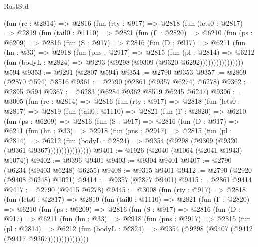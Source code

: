 \begin{lexlean}{RustStd}
\begin{coremodule}
{\begin{coremodule}
{{{{{{{{{{{{{{{{{{{{{{{{{{      (fun (rc : @2814) =>
      @2816
        (fun (rty : @917) =>
        @2818
          (fun (lets0 : @2817) =>
          @2819
            (fun (tail0 : @1110) =>
            @2821
              (fun (Γ : @2820) =>
              @6210
                (fun (ps : @6209) =>
                @2816
                  (fun (S : @917) =>
                  @2816
                    (fun (D : @917) =>
                    @6211
                      (fun (hn : @33) =>
                      @2918
                        (fun (pns : @2917) =>
                        @2815
                          (fun (pl : @2814) =>
                          @6212
                            (fun (bodyL : @2824) => @9293 (@9298 (@9309 (@9320 @6292))))))))))))))))
    @594
@9353 := @9291 (@2807 @594)
@9354 := @2790 @9353
@9357 := @2869 (@2870 @594) @8516
@9361 := @2790 (@2861 (@9357 @6274) @6278)
@9362 := @2895 @594
@9367 := @6283 (@6284 @9362 @8519 @6245 @6247)
@9396 := @3005
    (fun (rc : @2814) =>
    @2816
      (fun (rty : @917) =>
      @2818
        (fun (lets0 : @2817) =>
        @2819
          (fun (tail0 : @1110) =>
          @2821
            (fun (Γ : @2820) =>
            @6210
              (fun (ps : @6209) =>
              @2816
                (fun (S : @917) =>
                @2816
                  (fun (D : @917) =>
                  @6211
                    (fun (hn : @33) =>
                    @2918
                      (fun (pns : @2917) =>
                      @2815
                        (fun (pl : @2814) =>
                        @6212
                          (fun (bodyL : @2824) =>
                          @9354 (@9298 (@9309 (@9320 (@9361 @9367))))))))))))))))
@9401 := @1926 (@2040 (@1064 (@2041 @1943) @1074))
@9402 := @9396 @9401
@9403 := @9304 @9401
@9407 := @2790 (@6234 (@9403 @6248) @6255)
@9408 := @9315 @9401
@9412 := @2790 (@2920 (@9408 @6248) @1021)
@9414 := @9357 (@2877 @9401)
@9415 := @2861 @9414
@9417 := @2790 (@9415 @6278)
@9445 := @3008
    (fun (rty : @917) =>
    @2818
      (fun (lets0 : @2817) =>
      @2819
        (fun (tail0 : @1110) =>
        @2821
          (fun (Γ : @2820) =>
          @6210
            (fun (ps : @6209) =>
            @2816
              (fun (S : @917) =>
              @2816
                (fun (D : @917) =>
                @6211
                  (fun (hn : @33) =>
                  @2918
                    (fun (pns : @2917) =>
                    @2815
                      (fun (pl : @2814) =>
                      @6212
                        (fun (bodyL : @2824) =>
                        @9354 (@9298 (@9407 (@9412 (@9417 @9367)))))))))))))))
}}}}}}}}}}}}}}}}}}}}}}}}}}
\end{coremodule}}
\end{coremodule}
\end{lexlean}
